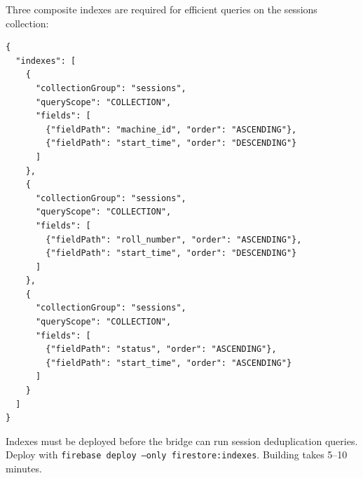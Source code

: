 Three composite indexes are required for efficient queries on the sessions collection:

\begin{lstlisting}[style=jsonlstyle,caption={v2/firestore.indexes.json}]
{
  "indexes": [
    {
      "collectionGroup": "sessions",
      "queryScope": "COLLECTION",
      "fields": [
        {"fieldPath": "machine_id", "order": "ASCENDING"},
        {"fieldPath": "start_time", "order": "DESCENDING"}
      ]
    },
    {
      "collectionGroup": "sessions",
      "queryScope": "COLLECTION",
      "fields": [
        {"fieldPath": "roll_number", "order": "ASCENDING"},
        {"fieldPath": "start_time", "order": "DESCENDING"}
      ]
    },
    {
      "collectionGroup": "sessions",
      "queryScope": "COLLECTION",
      "fields": [
        {"fieldPath": "status", "order": "ASCENDING"},
        {"fieldPath": "start_time", "order": "ASCENDING"}
      ]
    }
  ]
}
\end{lstlisting}

Indexes must be deployed before the bridge can run session deduplication queries. Deploy with \texttt{firebase deploy --only firestore:indexes}. Building takes 5--10 minutes.
